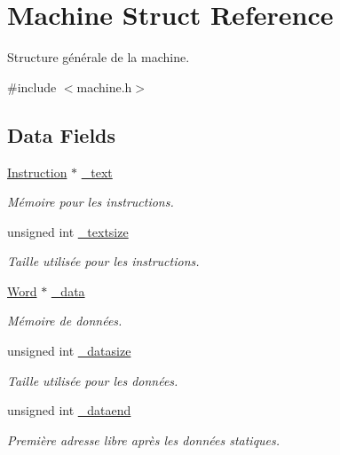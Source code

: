 \hypertarget{struct_machine}{\section{\-Machine \-Struct \-Reference}
\label{struct_machine}
}


\-Structure générale de la machine.  




{\ttfamily \#include $<$machine.\-h$>$}

\subsection*{\-Data \-Fields}
\begin{DoxyCompactItemize}
\item 
\hyperlink{union_instruction}{\-Instruction} $\ast$ \hyperlink{struct_machine_ac3249102d1999b98e27e51867198e39a}{\-\_\-text}
\begin{DoxyCompactList}\small\item\em \-Mémoire pour les instructions. \end{DoxyCompactList}\item 
unsigned int \hyperlink{struct_machine_ac0943af89706f023b8f3c9c75e2c9f16}{\-\_\-textsize}
\begin{DoxyCompactList}\small\item\em \-Taille utilisée pour les instructions. \end{DoxyCompactList}\item 
\hyperlink{instruction_8h_a0b5b15ce5f3a75b5dd0de6643cd3d958}{\-Word} $\ast$ \hyperlink{struct_machine_a4d0ccf4cdbb4b1b968aaa93dae278c47}{\-\_\-data}
\begin{DoxyCompactList}\small\item\em \-Mémoire de données. \end{DoxyCompactList}\item 
unsigned int \hyperlink{struct_machine_a45bdca8bd79802ec21021ab3a6ef8e2c}{\-\_\-datasize}
\begin{DoxyCompactList}\small\item\em \-Taille utilisée pour les données. \end{DoxyCompactList}\item 
unsigned int \hyperlink{struct_machine_a6672a65c5a3319e5d1dc646d6c4e720f}{\-\_\-dataend}
\begin{DoxyCompactList}\small\item\em \-Première adresse libre après les données statiques. \end{DoxyCompactList}\item 

\end{DoxyCompactItemize}

